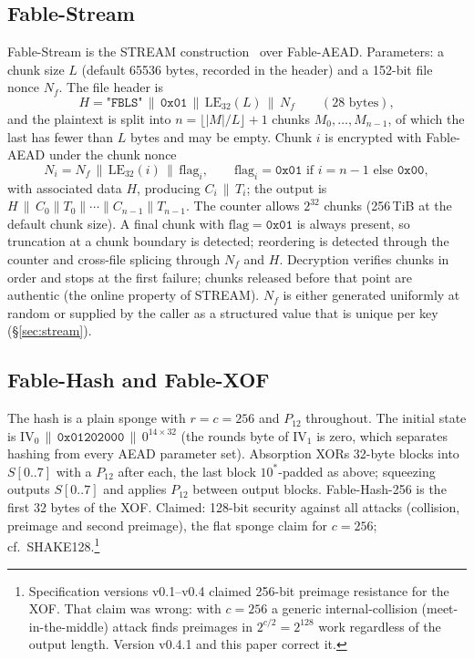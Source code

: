 \documentclass{iacrtrans}
\newcommand{\FableAEAD}{\textsf{Fable-AEAD}\xspace}
\newcommand{\FableStream}{\textsf{Fable-Stream}\xspace}
\newcommand{\FableHash}{\textsf{Fable-Hash}\xspace}
\newcommand{\FableXOF}{\textsf{Fable-XOF}\xspace}
\newcommand{\PP}[1]{P_{#1}}
\begin{document}
\subsection{\FableStream}
\label{sec:streamspec}
\FableStream is the STREAM construction~\cite{HRRV15} over \FableAEAD. Parameters: a chunk size $L$ (default 65536 bytes, recorded in the header) and a 152-bit file nonce $N_f$. The file header is
\[
H = \texttt{"FBLS"} \,\|\, \texttt{0x01} \,\|\, \mathrm{LE}_{32}(L) \,\|\, N_f \qquad (28 \text{ bytes}),
\]
and the plaintext is split into $n = \lfloor |M|/L \rfloor + 1$ chunks $M_0,\ldots,M_{n-1}$, of which the last has fewer than $L$ bytes and may be empty. Chunk $i$ is encrypted with \FableAEAD under the chunk nonce
\[
N_i = N_f \,\|\, \mathrm{LE}_{32}(i) \,\|\, \mathrm{flag}_i,\qquad \mathrm{flag}_i = \texttt{0x01} \text{ if } i = n-1 \text{ else } \texttt{0x00},
\]
with associated data $H$, producing $C_i \,\|\, T_i$; the output is $H \,\|\, C_0 \| T_0 \| \cdots \| C_{n-1} \| T_{n-1}$. The counter allows $2^{32}$ chunks (256\,TiB at the default chunk size). A final chunk with $\mathrm{flag} = \texttt{0x01}$ is always present, so truncation at a chunk boundary is detected; reordering is detected through the counter and cross-file splicing through $N_f$ and $H$. Decryption verifies chunks in order and stops at the first failure; chunks released before that point are authentic (the online property of STREAM). $N_f$ is either generated uniformly at random or supplied by the caller as a structured value that is unique per key (\S\ref{sec:stream}).

\subsection{\FableHash and \FableXOF}
\label{sec:hashspec}
The hash is a plain sponge with $r = c = 256$ and $\PP{12}$ throughout. The initial state is $\mathrm{IV}_0 \,\|\, \texttt{0x01202000} \,\|\, 0^{14\times 32}$ (the rounds byte of $\mathrm{IV}_1$ is zero, which separates hashing from every AEAD parameter set). Absorption XORs 32-byte blocks into $S[0..7]$ with a $\PP{12}$ after each, the last block $10^*$-padded as above; squeezing outputs $S[0..7]$ and applies $\PP{12}$ between output blocks. \FableHash-256 is the first 32 bytes of the XOF. Claimed: 128-bit security against all attacks (collision, preimage and second preimage), the flat sponge claim for $c = 256$; cf.\ SHAKE128.\footnote{Specification versions v0.1--v0.4 claimed 256-bit preimage resistance for the XOF. That claim was wrong: with $c = 256$ a generic internal-collision (meet-in-the-middle) attack finds preimages in $2^{c/2} = 2^{128}$ work regardless of the output length. Version v0.4.1 and this paper correct it.}
\end{document}
